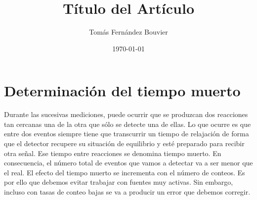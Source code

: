 \documentclass[a4paper,12pt]{article} %
\title{Título del Artículo}
\author{Tomás Fernández Bouvier}
\date{\today} %
\begin{document}

\maketitle         %

\section{Determinación del tiempo muerto}
Durante las sucesivas mediciones, puede ocurrir que se produzcan dos reacciones tan cercanas una de la otra que sólo se detecte una de ellas. Lo que ocurre es que entre dos eventos siempre tiene que transcurrir un tiempo de relajación de forma que el detector recupere su situación de equilibrio y esté preparado para recibir otra señal. Ese tiempo entre reacciones se denomina tiempo muerto. En consecuencia, el número total de eventos que vamos a detectar va a ser menor que el real. El efecto del tiempo muerto se incrementa con el número de conteos. Es por ello que debemos evitar trabajar con fuentes muy activas. Sin embargo, incluso con tasas de conteo bajas se va a producir un error que debemos corregir. 
\end{document}
